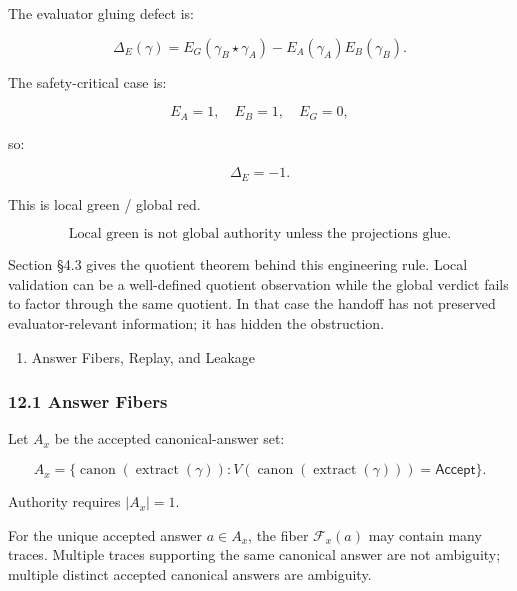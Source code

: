 \documentclass[
  10pt,
]{article}
\providecommand{\tightlist}{%
  \setlength{\itemsep}{0pt}\setlength{\parskip}{0pt}}
\providecommand{\tightlist}{%
  \setlength{\itemsep}{0pt}\setlength{\parskip}{0pt}}
\begin{document}
The evaluator gluing defect is:

\protect\hypertarget{math-E0144-0192}{}{\[
\Delta_E(\gamma) = E_G(\gamma_B\star\gamma_A) - E_A(\gamma_A)E_B(\gamma_B).
\]}

The safety-critical case is:

\protect\hypertarget{math-E0145-0193}{}{\[
E_A=1,\quad E_B=1,\quad E_G=0,
\]}

so:

\protect\hypertarget{math-E0146-0194}{}{\[
\Delta_E=-1.
\]}

This is local green / global red.

\protect\hypertarget{math-E0147-0195}{}{\[
\boxed{
\text{Local green is not global authority unless the projections glue.}
}
\]}

Section §4.3 gives the quotient theorem behind this engineering rule. Local validation can be a well-defined quotient observation while the global verdict fails to factor through the same quotient. In that case the handoff has not preserved evaluator-relevant information; it has hidden the obstruction.

\begin{enumerate}
\def\labelenumi{\arabic{enumi}.}
\setcounter{enumi}{11}
\tightlist
\item
  Answer Fibers, Replay, and Leakage
\end{enumerate}

\subsubsection{12.1 Answer Fibers}\label{answer-fibers}

Let \protect\hypertarget{math-E0148-0196}{}{\(A_x\)} be the accepted canonical-answer set:

\protect\hypertarget{math-E0149-0197}{}{\[
A_x = \{ \operatorname{canon}(\operatorname{extract}(\gamma)) : V(\operatorname{canon}(\operatorname{extract}(\gamma))) = \mathsf{Accept} \}.
\]}

Authority requires \protect\hypertarget{math-E0150-0198}{}{\(|A_x| = 1\)}.

For the unique accepted answer \protect\hypertarget{math-E0151-0199}{}{\(a \in A_x\)}, the fiber \protect\hypertarget{math-E0152-0200}{}{\(\mathcal F_x(a)\)} may contain many traces. Multiple traces supporting the same canonical answer are not ambiguity; multiple distinct accepted canonical answers are ambiguity.
\end{document}
